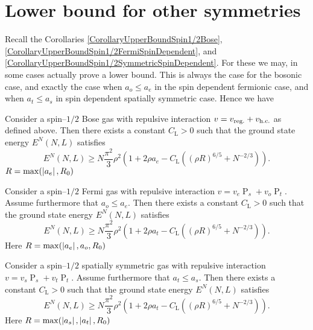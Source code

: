 \section{Lower bound for other symmetries}
Recall the Corollaries \ref{CorollaryUpperBoundSpin1/2Bose}, \ref{CorollaryUpperBoundSpin1/2FermiSpinDependent}, and \ref{CorollaryUpperBoundSpin1/2SymmetricSpinDependent}. For these we may, in some cases actually prove a lower bound. This is always the case for the bosonic case, and exactly the case when $ a_o\leq a_e $ in the spin dependent fermionic case, and when $ a_t\leq a_s $ in spin dependent spatially symmetric case. Hence we have 
\begin{theorem}
	\label{TheoremLowerBoundSpin1/2Bose}
	Consider a spin--$ 1/2 $ Bose gas with repulsive interaction  $v=v_{\textnormal{reg.}}+v_{\textnormal{h.c.}}$ as defined above. Then there exists a constant $C_\text{L}>0$ such that the ground state energy $E^N(N,L)$ satisfies
	\begin{equation}
	\label{eqlowerSpin1/2Bose}
	E^N(N,L)\geq N\frac{\pi^2}{3}\rho^2\left(1+2\rho a_e-C_\text{L}\left((\rho R)^{6/5}+N^{-2/3}\right)\right).
	\end{equation}
	$ R=\max(\left\lvert a_e \right\rvert, R_0) $
\end{theorem}
	\begin{theorem}
	\label{TheoremLowerBoundSpinDependentSpin1/2Fermi}
	Consider a spin--$ 1/2 $ Fermi gas with repulsive interaction  $v=v_e\operatorname{P}_s+v_o\operatorname{P}_t$. Assume furthermore that $ a_o\leq a_e $. Then there exists a constant $C_\text{L}>0$ such that the ground state energy $E^N(N,L)$ satisfies
	\begin{equation}
	\label{eqlowerSpinDependtSpin1/2Fermi}
	E^N(N,L)\geq N\frac{\pi^2}{3}\rho^2\left(1+2\rho a_t-C_\text{L}\left((\rho R)^{6/5}+N^{-2/3}\right)\right).
	\end{equation}
	Here $ R=\max(\left\lvert a_e \right\rvert, a_o, R_0) $
\end{theorem}
\begin{theorem}
	\label{TheoremLowerBoundSpinDependentSpin1/2SpatiallySymmetric}
	Consider a spin--$ 1/2 $ spatially symmetric gas with repulsive interaction  $v=v_s\operatorname{P}_s+v_t\operatorname{P}_t$. Assume furthermore that $ a_t\leq a_s $. Then there exists a constant $C_\text{L}>0$ such that the ground state energy $E^N(N,L)$ satisfies
	\begin{equation}
	\label{eqlower}
	E^N(N,L)\geq N\frac{\pi^2}{3}\rho^2\left(1+2\rho a_t-C_\text{L}\left((\rho R)^{6/5}+N^{-2/3}\right)\right).
	\end{equation}
	Here $ R=\max(\left\lvert a_s \right\rvert, \left\lvert a_t \right\rvert, R_0) $
\end{theorem}




